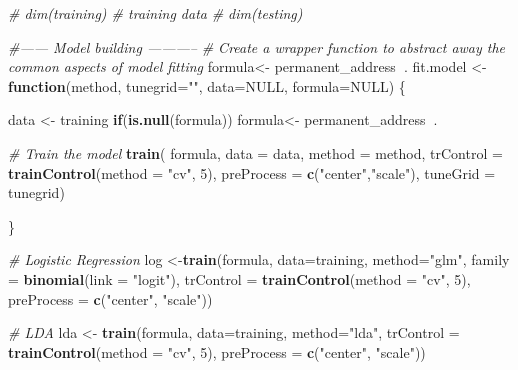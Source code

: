 \documentclass[
  10pt,
]{article}
\newenvironment{Shaded}{\begin{snugshade}}{\end{snugshade}}
\newcommand{\CommentTok}[1]{\textcolor[rgb]{0.56,0.35,0.01}{\textit{#1}}}
\newcommand{\ControlFlowTok}[1]{\textcolor[rgb]{0.13,0.29,0.53}{\textbf{#1}}}
\newcommand{\DataTypeTok}[1]{\textcolor[rgb]{0.13,0.29,0.53}{#1}}
\newcommand{\DecValTok}[1]{\textcolor[rgb]{0.00,0.00,0.81}{#1}}
\newcommand{\KeywordTok}[1]{\textcolor[rgb]{0.13,0.29,0.53}{\textbf{#1}}}
\newcommand{\NormalTok}[1]{#1}
\newcommand{\OperatorTok}[1]{\textcolor[rgb]{0.81,0.36,0.00}{\textbf{#1}}}
\newcommand{\OtherTok}[1]{\textcolor[rgb]{0.56,0.35,0.01}{#1}}
\newcommand{\StringTok}[1]{\textcolor[rgb]{0.31,0.60,0.02}{#1}}
\begin{document}
\begin{Shaded}
\begin{Highlighting}[]
{{{\CommentTok{# dim(training) # training data}
\CommentTok{# dim(testing)}





\CommentTok{#------ Model building -----------}
\CommentTok{# Create a wrapper function to abstract away the common aspects of model fitting}
\NormalTok{formula<-}\StringTok{ }\NormalTok{permanent_address}\OperatorTok{~}\NormalTok{.}
\NormalTok{fit.model <-}\StringTok{ }\ControlFlowTok{function}\NormalTok{(method, }\DataTypeTok{tunegrid=}\StringTok{""}\NormalTok{, }\DataTypeTok{data=}\OtherTok{NULL}\NormalTok{, }\DataTypeTok{formula=}\OtherTok{NULL}\NormalTok{) \{}
  
\NormalTok{  data <-}\StringTok{ }\NormalTok{training}
  \ControlFlowTok{if}\NormalTok{(}\KeywordTok{is.null}\NormalTok{(formula)) formula<-}\StringTok{ }\NormalTok{permanent_address}\OperatorTok{~}\NormalTok{.}
  
  \CommentTok{# Train the model}
   \KeywordTok{train}\NormalTok{(}
\NormalTok{           formula,}
           \DataTypeTok{data =}\NormalTok{ data,}
           \DataTypeTok{method =}\NormalTok{ method,}
           \DataTypeTok{trControl =} \KeywordTok{trainControl}\NormalTok{(}\DataTypeTok{method =} \StringTok{"cv"}\NormalTok{, }\DecValTok{5}\NormalTok{),}
           \DataTypeTok{preProcess =} \KeywordTok{c}\NormalTok{(}\StringTok{"center"}\NormalTok{,}\StringTok{"scale"}\NormalTok{),}
           \DataTypeTok{tuneGrid =}\NormalTok{ tunegrid)}
          
\NormalTok{\}}



\CommentTok{# Logistic Regression}
\NormalTok{log <-}\KeywordTok{train}\NormalTok{(formula,}
                 \DataTypeTok{data=}\NormalTok{training,}
                 \DataTypeTok{method=}\StringTok{"glm"}\NormalTok{,}
                 \DataTypeTok{family =} \KeywordTok{binomial}\NormalTok{(}\DataTypeTok{link =} \StringTok{"logit"}\NormalTok{),}
                \DataTypeTok{trControl =} \KeywordTok{trainControl}\NormalTok{(}\DataTypeTok{method =} \StringTok{"cv"}\NormalTok{, }\DecValTok{5}\NormalTok{),}
                \DataTypeTok{preProcess =} \KeywordTok{c}\NormalTok{(}\StringTok{"center"}\NormalTok{, }\StringTok{"scale"}\NormalTok{)) }



\CommentTok{# LDA}
\NormalTok{lda <-}\StringTok{ }\KeywordTok{train}\NormalTok{(formula,}
                 \DataTypeTok{data=}\NormalTok{training,}
                 \DataTypeTok{method=}\StringTok{"lda"}\NormalTok{,}
                \DataTypeTok{trControl =} \KeywordTok{trainControl}\NormalTok{(}\DataTypeTok{method =} \StringTok{"cv"}\NormalTok{, }\DecValTok{5}\NormalTok{),}
                \DataTypeTok{preProcess =} \KeywordTok{c}\NormalTok{(}\StringTok{"center"}\NormalTok{, }\StringTok{"scale"}\NormalTok{))}




}}}
\end{Highlighting}
\end{Shaded}
\end{document}
